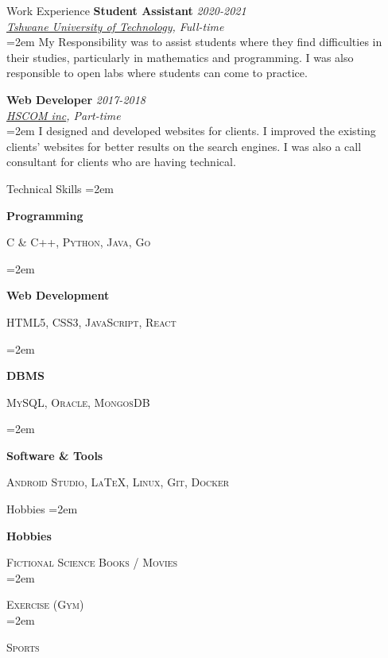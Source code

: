 \documentclass{resume} %
\newlength{\spacebox}
\newcommand{\sepspace}{\vspace*{1em}}           %
\newcommand{\EducationEntry}[4]{
        \noindent \textbf{#1} \hfill \textit{#2} \\     %
        \noindent \textit{#3} \\        %
        \noindent  #4  %
        \normalsize \par}
\newcommand{\WorkEntry}[4]{				  %
        \noindent \textbf{#1} \hfill \textit{#2} \\      %
        \noindent \textit{#3} \\              %
        \noindent\hangindent=2em\hangafter=0  #4 %
        \normalsize \par}
\newcommand{\SkillsEntry}[2]{      %
		\noindent\hangindent=2em\hangafter=0 %
		\parbox{\spacebox}{        %
    \textbf{#1}}			   %
    \hspace{1em} \textsc{#2} \par}    %
\newcommand{\HobbieEntry}[2]{      %
		\noindent\hangindent=2em\hangafter=0 %
		\parbox{\spacebox}{        %
    \textbf{#1}}			   %
    \hspace{1em} \textsc{#2} \\}    %
\begin{document}
\begin{rSection}{Work Experience}
        \WorkEntry{Student Assistant}{2020-2021}
        {\href{https://www.tut.ac.za/} {Tshwane University of Technology}, Full-time}
        {My Responsibility was to assist students where they find difficulties in their studies, particularly in mathematics and programming. I was also responsible to open labs where students can come to practice.}

        \WorkEntry{Web Developer}{2017-2018}
        {\href{https://www.hscom.co.za/} {HSCOM inc}, Part-time}
        {I designed and developed websites for clients. I improved the existing clients’ websites for better results on the search engines. I was also a call consultant for clients who are having technical.}


\end{rSection}

\pagebreak

\begin{rSection}{Technical Skills}
        \SkillsEntry{Programming}{C \& C++, Python, Java, Go}
        \SkillsEntry{Web Development}{HTML5, CSS3, JavaScript, React}
        \SkillsEntry{DBMS}{MySQL, Oracle, MongosDB}
        \SkillsEntry{Software \& Tools}{Android Studio, \LaTeX, Linux, Git, Docker }
\end{rSection}


\begin{rSection}{Hobbies}
        \HobbieEntry{Hobbies}{Fictional Science Books / Movies }
        \HobbieEntry{}{Exercise (Gym)}
        \HobbieEntry{}{Sports}
\end{rSection}
\end{document}
